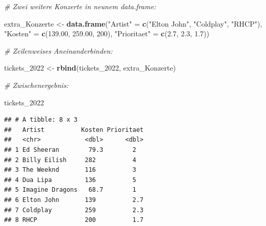 \documentclass[
  ngerman,
]{book}
\newenvironment{Shaded}{\begin{snugshade}}{\end{snugshade}}
\newcommand{\CommentTok}[1]{\textcolor[rgb]{0.56,0.35,0.01}{\textit{#1}}}
\newcommand{\DecValTok}[1]{\textcolor[rgb]{0.00,0.00,0.81}{#1}}
\newcommand{\FloatTok}[1]{\textcolor[rgb]{0.00,0.00,0.81}{#1}}
\newcommand{\FunctionTok}[1]{\textcolor[rgb]{0.13,0.29,0.53}{\textbf{#1}}}
\newcommand{\NormalTok}[1]{#1}
\newcommand{\OtherTok}[1]{\textcolor[rgb]{0.56,0.35,0.01}{#1}}
\newcommand{\StringTok}[1]{\textcolor[rgb]{0.31,0.60,0.02}{#1}}
\begin{document}
\begin{Shaded}
\begin{Highlighting}[]
\CommentTok{\# Zwei weitere Konzerte in neunem data.frame:}

\NormalTok{extra\_Konzerte }\OtherTok{\textless{}{-}} \FunctionTok{data.frame}\NormalTok{(}\StringTok{"Artist"} \OtherTok{=} \FunctionTok{c}\NormalTok{(}\StringTok{"Elton John"}\NormalTok{, }\StringTok{"Coldplay"}\NormalTok{, }\StringTok{"RHCP"}\NormalTok{),}
                             \StringTok{"Kosten"} \OtherTok{=} \FunctionTok{c}\NormalTok{(}\FloatTok{139.00}\NormalTok{, }\FloatTok{259.00}\NormalTok{, }\DecValTok{200}\NormalTok{),}
                             \StringTok{"Prioritaet"} \OtherTok{=} \FunctionTok{c}\NormalTok{(}\FloatTok{2.7}\NormalTok{, }\FloatTok{2.3}\NormalTok{, }\FloatTok{1.7}\NormalTok{))}

\CommentTok{\# Zeilenweises Aneinanderbinden:}

\NormalTok{tickets\_2022 }\OtherTok{\textless{}{-}} \FunctionTok{rbind}\NormalTok{(tickets\_2022, extra\_Konzerte)}

\CommentTok{\# Zwischenergebnis:}

\NormalTok{tickets\_2022}
\end{Highlighting}
\end{Shaded}

\begin{verbatim}
## # A tibble: 8 x 3
##   Artist          Kosten Prioritaet
##   <chr>            <dbl>      <dbl>
## 1 Ed Sheeran        79.3        2  
## 2 Billy Eilish     282          4  
## 3 The Weeknd       116          3  
## 4 Dua Lipa         136          5  
## 5 Imagine Dragons   68.7        1  
## 6 Elton John       139          2.7
## 7 Coldplay         259          2.3
## 8 RHCP             200          1.7
\end{verbatim}
\end{document}

